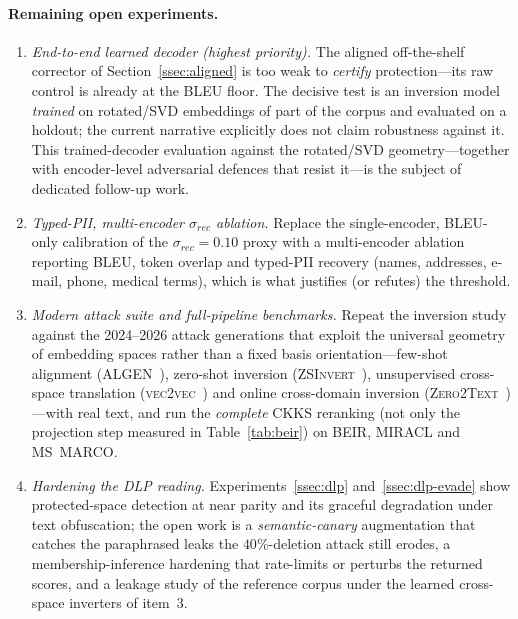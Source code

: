 \documentclass[11pt,a4paper]{article}
\begin{document}
\paragraph{Remaining open experiments.}
\begin{enumerate}[leftmargin=20pt,topsep=2pt,itemsep=3pt]
\item \emph{End-to-end learned decoder (highest priority).} The aligned
off-the-shelf corrector of Section~\ref{ssec:aligned} is too weak to
\emph{certify} protection---its raw control is already at the BLEU floor.
The decisive test is an inversion model \emph{trained} on rotated/SVD
embeddings of part of the corpus and evaluated on a holdout; the current
narrative explicitly does not claim robustness against it. This trained-decoder evaluation against the rotated/SVD geometry---together with encoder-level adversarial defences that resist it---is the subject of dedicated follow-up work.
\item \emph{Typed-PII, multi-encoder $\sigma_{rec}$ ablation.} Replace the
single-encoder, BLEU-only calibration of the $\sigma_{rec}=0.10$ proxy with
a multi-encoder ablation reporting BLEU, token overlap and typed-PII
recovery (names, addresses, e-mail, phone, medical terms), which is what
justifies (or refutes) the threshold.
\item \emph{Modern attack suite and full-pipeline benchmarks.} Repeat the
inversion study against the 2024--2026 attack generations that exploit the
universal geometry of embedding spaces rather than a fixed basis
orientation---few-shot alignment (\textsc{ALGEN}~\cite{ref_algen}),
zero-shot inversion (\textsc{ZSInvert}~\cite{ref_zsinvert}), unsupervised
cross-space translation (\textsc{vec2vec}~\cite{ref_vec2vec}) and online
cross-domain inversion (\textsc{Zero2Text}~\cite{ref_zero2text})---with real
text, and run the \emph{complete} CKKS reranking (not only the projection
step measured in Table~\ref{tab:beir}) on BEIR, MIRACL and MS~MARCO.
\item \emph{Hardening the DLP reading.} Experiments~\ref{ssec:dlp}
and~\ref{ssec:dlp-evade} show protected-space detection at near parity and
its graceful degradation under text obfuscation; the open work is a
\emph{semantic-canary} augmentation that catches the paraphrased leaks the
$40\%$-deletion attack still erodes, a membership-inference hardening that
rate-limits or perturbs the returned scores, and a leakage study of the
reference corpus under the learned cross-space inverters of item~3.
\end{enumerate}
\end{document}
